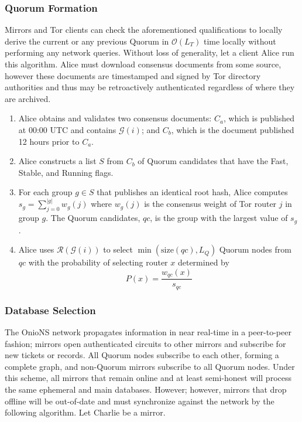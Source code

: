 \documentclass[USenglish,oneside,twocolumn]{article}
\begin{document}
\subsubsection{Quorum Formation}
\label{sec:qFormation}

Mirrors and Tor clients can check the aforementioned qualifications to locally derive the current or any previous Quorum in $ \mathcal{O}(L_{T}) $ time locally without performing any network queries. Without loss of generality, let a client Alice run this algorithm. Alice must download consensus documents from some source, however these documents are timestamped and signed by Tor directory authorities and thus may be retroactively authenticated regardless of where they are archived.

\begin{enumerate}
	\item Alice obtains and validates two consensus documents: $ C_{a} $, which is published at 00:00 UTC and contains $ \mathcal{G}(i) $; and $ C_{b} $, which is the document published 12 hours prior to $ C_{a} $. 
	\item Alice constructs a list $ S $ from $ C_{b} $ of Quorum candidates that have the Fast, Stable, and Running flags.
	\item For each group $ g \in S $ that publishes an identical root hash, Alice computes $ s_{g} = \sum_{j=0}^{\left\vert{g}\right\vert} w_{g}(j) $ where $ w_{g}(j) $ is the consensus weight of Tor router $ j $ in group $ g $. The Quorum candidates, $ \mathit{qc} $, is the group with the largest value of $ s_{g} $.
	\item Alice uses $ \mathcal{R}(\mathcal{G}(i)) $ to select $ \min(\mathrm{size}(\mathit{qc}), L_{Q}) $ Quorum nodes from $ \mathit{qc} $ with the probability of selecting router $ x $ determined by 
	\[
			P(x) = \frac{w_{\mathit{qc}}(x)}{s_{\mathit{qc}}}
	\]
\end{enumerate}

\subsubsection{Database Selection}

The OnioNS network propagates information in near real-time in a peer-to-peer fashion; mirrors open authenticated circuits to other mirrors and subscribe for new tickets or records. All Quorum nodes subscribe to each other, forming a complete graph, and non-Quorum mirrors subscribe to all Quorum nodes. Under this scheme, all mirrors that remain online and at least semi-honest will process the same ephemeral and main databases. However; however, mirrors that drop offline will be out-of-date and must synchronize against the network by the following algorithm. Let Charlie be a mirror.
\end{document}

